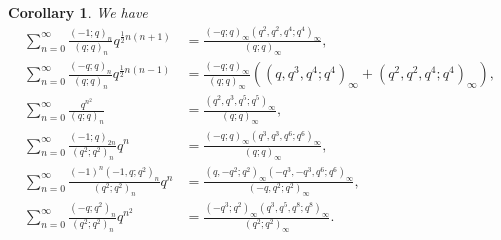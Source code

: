 \documentclass[reqno,12pt]{amsart}
\newtheorem{corollary}[theorem]{Corollary}
\theoremstyle{remark}
\numberwithin{equation}{section}
\begin{document}

\begin{corollary}
We have
\begin{align}
\sum_{n=0}^{\infty}\frac{\left(-1;q\right)_{n}}
{\left(q;q\right)_n}q^{\frac{1}{2}n\left(n+1\right)}
&=\frac{\left(-q;q\right)_{\infty}\left(q^2,q^2,q^4;q^4\right)_{\infty}}
{\left(q;q\right)_{\infty}},\tag{S.12}\label{S.12}\\
\sum_{n=0}^{\infty}\frac{\left(-q;q\right)_{n}}
{\left(q;q\right)_n}q^{\frac{1}{2}n\left(n-1\right)}
&=\frac{\left(-q;q\right)_{\infty}}
{\left(q;q\right)_{\infty}}\left(\left(q,q^3,q^4;q^4\right)_{\infty}
+\left(q^2,q^2,q^4;q^4\right)_{\infty}\right),\tag{S.13}\label{S.13}\\
\sum_{n=0}^{\infty}\frac{q^{n^2}}
{\left(q;q\right)_n}
&=\frac{\left(q^2,q^3,q^5;q^5\right)_{\infty}}
{\left(q;q\right)_{\infty}},\tag{S.18}\label{S.18}\\
\sum_{n=0}^{\infty}\frac{\left(-1;q\right)_{2n}}
{\left(q^2;q^2\right)_n}q^{n}
&=\frac{\left(-q;q\right)_{\infty}\left(q^3,q^3,q^6;q^6\right)_{\infty}}
{\left(q;q\right)_{\infty}},\tag{S.24}\label{S.24}\\
\sum_{n=0}^{\infty}\frac{\left(-1\right)^n\left(-1,q;q^2\right)_n}
{\left(q^2;q^2\right)_n}q^{n}
&=\frac{\left(q,-q^2;q^2\right)_{\infty}\left(-q^3,-q^3,q^6;q^6\right)_{\infty}}
{\left(-q,q^2;q^2\right)_{\infty}},\tag{S.30}\label{S.30}\\
\sum_{n=0}^{\infty}\frac{\left(-q;q^2\right)_{n}}
{\left(q^2;q^2\right)_{n}}q^{n^2}
&=\frac{\left(-q^3;q^2\right)_{\infty}\left(q^3,q^5,q^8;q^8\right)_{\infty}}
{\left(q^2;q^2\right)_{\infty}}.\tag{S.36}\label{S.36}
\end{align}
\end{corollary}
\end{document}

